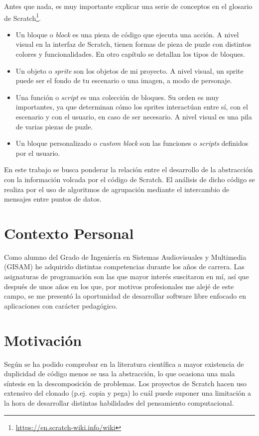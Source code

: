 \documentclass[a4paper, 12pt]{book}
\begin{document}
Antes que nada, es muy importante explicar una serie de conceptos en el glosario de Scratch\footnote{\url{https://en.scratch-wiki.info/wiki}}. 
\begin{itemize}
 \item Un bloque o \textit{block} es una pieza de código que ejecuta una acción. A nivel visual en la interfaz de Scratch, tienen formas de pieza de puzle con distintos colores y funcionalidades. En otro capítulo se detallan los tipos de bloques.
 \item Un objeto o \textit{sprite} son los objetos de mi proyecto. A nivel visual, un sprite puede ser el fondo de tu escenario o una imagen, a modo de personaje.
 \item Una función o \textit{script} es una colección de bloques. Su orden es muy importantes, ya que determinan cómo los sprites interactúan entre sí, con el escenario y con el usuario, en caso de ser necesario. A nivel visual es una pila de varias piezas de puzle.
 \item Un bloque personalizado o \textit{custom block} son las funciones o \textit{scripts} definidos por el usuario.
\end{itemize}

En este trabajo se busca ponderar la relación entre el desarrollo de la abstracción con la información volcada por el código de Scratch. El análisis de dicho código se realiza por el uso de algoritmos de agrupación mediante el intercambio de mensajes entre puntos de datos. \cite{clusteringpaper}

\section{Contexto Personal}
\label{sec:contexto}

Como alumno del Grado de Ingeniería en Sistemas Audiovisuales y Multimedia (GISAM) he adquirido distintas competencias durante los años de carrera. Las asignaturas de programación son las que mayor interés suscitaron en mí, así que después de unos años en los que, por motivos profesionales me alejé de este campo, se me presentó la oportunidad de desarrollar software libre enfocado en aplicaciones con carácter pedagógico.

\section{Motivación}
\label{sec:motivacion}

Según se ha podido comprobar en la literatura científica \cite{baxter_yahin} a mayor existencia de duplicidad de código menos se usa la abstracción, lo que ocasiona una mala síntesis en la descomposición de problemas.  Los proyectos de Scratch hacen uso extensivo del clonado (p.ej. copia y pega) lo cuál puede suponer una limitación a la hora de desarrollar distintas habilidades del pensamiento computacional.
\end{document}
